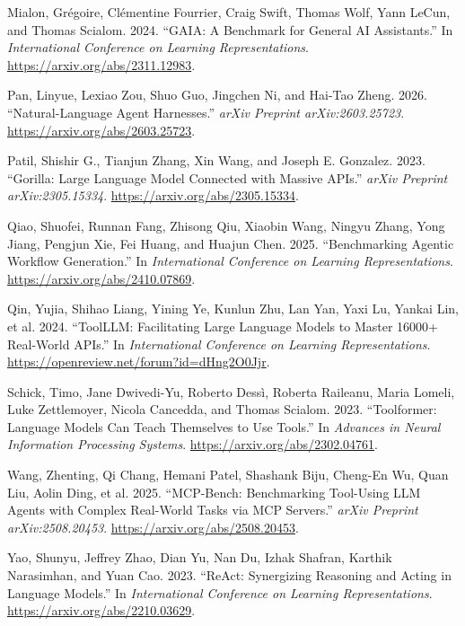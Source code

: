 \documentclass[
  10pt,
]{article}
\newlength{\cslhangindent}
\newenvironment{CSLReferences}[2] %
 {\begin{list}{}{%
  \setlength{\itemindent}{0pt}
  \setlength{\leftmargin}{0pt}
  \setlength{\parsep}{0pt}
  \ifodd #1
   \setlength{\leftmargin}{\cslhangindent}
   \setlength{\itemindent}{-1\cslhangindent}
  \fi
  \setlength{\itemsep}{#2\baselineskip}}}
 {\end{list}}
\begin{document}
\begin{CSLReferences}{1}{0}
Mialon, Grégoire, Clémentine Fourrier, Craig Swift, Thomas Wolf, Yann
LeCun, and Thomas Scialom. 2024. {``GAIA: A Benchmark for General AI
Assistants.''} In \emph{International Conference on Learning
Representations}. \url{https://arxiv.org/abs/2311.12983}.

Pan, Linyue, Lexiao Zou, Shuo Guo, Jingchen Ni, and Hai-Tao Zheng. 2026.
{``Natural-Language Agent Harnesses.''} \emph{arXiv Preprint
arXiv:2603.25723}. \url{https://arxiv.org/abs/2603.25723}.

Patil, Shishir G., Tianjun Zhang, Xin Wang, and Joseph E. Gonzalez.
2023. {``Gorilla: Large Language Model Connected with Massive APIs.''}
\emph{arXiv Preprint arXiv:2305.15334}.
\url{https://arxiv.org/abs/2305.15334}.

Qiao, Shuofei, Runnan Fang, Zhisong Qiu, Xiaobin Wang, Ningyu Zhang,
Yong Jiang, Pengjun Xie, Fei Huang, and Huajun Chen. 2025.
{``Benchmarking Agentic Workflow Generation.''} In \emph{International
Conference on Learning Representations}.
\url{https://arxiv.org/abs/2410.07869}.

Qin, Yujia, Shihao Liang, Yining Ye, Kunlun Zhu, Lan Yan, Yaxi Lu,
Yankai Lin, et al. 2024. {``ToolLLM: Facilitating Large Language Models
to Master 16000+ Real-World APIs.''} In \emph{International Conference
on Learning Representations}.
\url{https://openreview.net/forum?id=dHng2O0Jjr}.

Schick, Timo, Jane Dwivedi-Yu, Roberto Dessì, Roberta Raileanu, Maria
Lomeli, Luke Zettlemoyer, Nicola Cancedda, and Thomas Scialom. 2023.
{``Toolformer: Language Models Can Teach Themselves to Use Tools.''} In
\emph{Advances in Neural Information Processing Systems}.
\url{https://arxiv.org/abs/2302.04761}.

Wang, Zhenting, Qi Chang, Hemani Patel, Shashank Biju, Cheng-En Wu, Quan
Liu, Aolin Ding, et al. 2025. {``MCP-Bench: Benchmarking Tool-Using LLM
Agents with Complex Real-World Tasks via MCP Servers.''} \emph{arXiv
Preprint arXiv:2508.20453}. \url{https://arxiv.org/abs/2508.20453}.

Yao, Shunyu, Jeffrey Zhao, Dian Yu, Nan Du, Izhak Shafran, Karthik
Narasimhan, and Yuan Cao. 2023. {``ReAct: Synergizing Reasoning and
Acting in Language Models.''} In \emph{International Conference on
Learning Representations}. \url{https://arxiv.org/abs/2210.03629}.


\end{CSLReferences}
\end{document}

